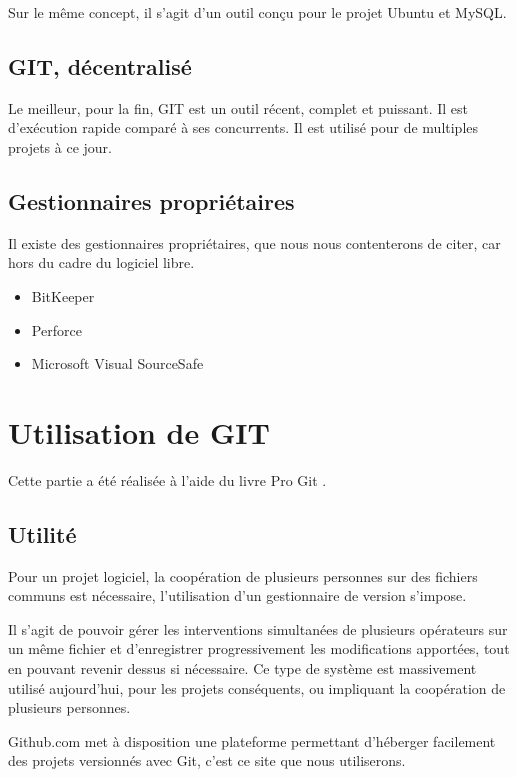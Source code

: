 Sur le même concept, il s'agit d'un outil conçu pour le projet Ubuntu et MySQL. 

\subsection{GIT, décentralisé}

Le meilleur, pour la fin, GIT est un outil récent, complet et puissant. Il est d'exécution rapide comparé à ses concurrents. Il est utilisé pour de multiples projets à ce jour. 

\subsection{Gestionnaires propriétaires}

Il existe des gestionnaires propriétaires, que nous nous contenterons de citer, car hors du cadre du logiciel libre. 
\begin{itemize}
\item BitKeeper
\item Perforce
\item Microsoft Visual SourceSafe
\end{itemize}

\section{Utilisation de GIT}
Cette partie a été réalisée à l'aide du livre Pro Git \cite{ProGit}. 

\subsection{Utilité}
\label{sec:utilite}

\par Pour un projet logiciel, la coopération de plusieurs personnes sur des fichiers communs est nécessaire, l'utilisation d'un gestionnaire de version s'impose. 
\par Il s'agit de pouvoir gérer les interventions simultanées de plusieurs opérateurs sur un même fichier et d'enregistrer progressivement les modifications apportées, tout en pouvant revenir dessus si nécessaire. Ce type de système est massivement utilisé aujourd'hui, pour les projets conséquents, ou impliquant la coopération de plusieurs personnes.
\par Github.com met à disposition une plateforme permettant d'héberger facilement des projets versionnés avec Git, c'est ce site que nous utiliserons.

